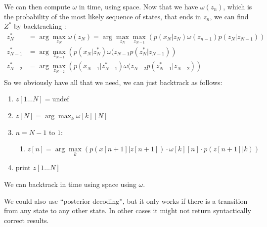     We can then compute $\omega$ in  time, using  space. 
    Now that we have $\omega(z_n)$, which is the probability of the most likely 
    sequence of states, that ends in $z_n$, we can find $Z^*$ by backtracking :
    \begin{align*}
        z^*_N &= \arg\max_{z_N}\omega(z_N) = \arg\max_{z_N}\max_{z_{N-1}} 
        \left(p(x_N|z_N)\omega(z_{n-1})p(z_N|z_{N-1})\right)\\
        z^*_{N-1} &= 
        \arg\max_{z_{N-1}}\left(p(x_N|z^*_N)\omega(z_{N-1}p(z^*_N|z_{N-1})\right)\\
        z^*_{N-2} &= 
        \arg\max_{z_{N-2}}\left(p(x_{N-1}|z^*_{N-1})\omega(z_{N-2}p(z^*_{N-1}|z_{N-2})\right)\\
    \end{align*}
    So we obviously have all that we need, we can just backtrack as follows:
    \begin{enumerate}
        \item $z[1\dots N] = \text{undef}$
        \item $z[N]=\arg\max_k \omega[k][N]$
        \item $n=N-1$ to $1$:
        \begin{enumerate}
            \item 
            \begin{equation*}
                z[n]=\arg\max_k\left(p(x[n+1]|z[n+1]) \cdot \omega[k][n] \cdot 
                p(z[n+1]|k)\right)
            \end{equation*}
        \end{enumerate}
        \item print $z[1\dots N]$
    \end{enumerate}
    We can backtrack in time  using space  using $\omega$.
    
    We could also use ``posterior decoding'', but it only works if there is a 
    transition from any state to any other state. In other cases it might not 
    return syntactically correct results.
    
